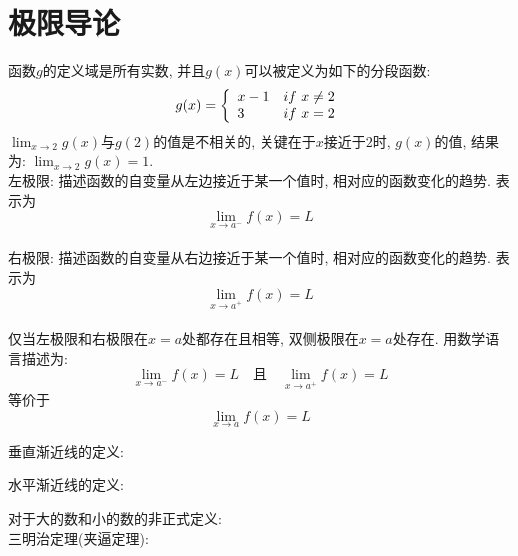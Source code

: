 \chapter{极限导论}
\phantom{空格}函数$g$的定义域是所有实数, 并且$g(x)$可以被定义为如下的分段函数:\\
\[
	g(x)=\left\{
	\begin{array}{l l}
		x-1 & if\ x\neq2\\
		3 & if\ x=2
	\end{array}
	\right.
\]
$\lim_{x\to2}g(x)$与$g(2)$的值是不相关的, 关键在于$x$接近于$2$时, $g(x)$的值, 结果为: $\lim_{x\to2}g(x)=1$.\\
\phantom{空格}左极限: 描述函数的自变量从左边接近于某一个值时, 相对应的函数变化的趋势. 表示为
\[\lim_{x\to a^-}f(x)=L\]\\
\phantom{空格}右极限: 描述函数的自变量从右边接近于某一个值时, 相对应的函数变化的趋势. 表示为
\[\lim_{x\to a^+}f(x)=L\]\\
仅当左极限和右极限在$x=a$处都存在且相等, 双侧极限在$x=a$处存在. 用数学语言描述为:\\
\[\lim_{x\to a^-}f(x)=L\quad\text{且}\quad\lim_{x\to a^+}f(x)=L\]
等价于
\[\lim_{x\to a}f(x)=L\]

垂直渐近线的定义:
{\par\centering
{}
\par}\vspace{4ex}

水平渐近线的定义:
{\par\centering
{}
\par}\vspace{4ex}

对于大的数和小的数的非正式定义:\\


三明治定理(夹逼定理):
{\par\centering
{}
\par}
